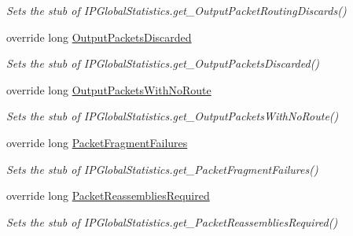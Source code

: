 \begin{DoxyCompactItemize}
\begin{DoxyCompactList}\small\item\em Sets the stub of I\-P\-Global\-Statistics.\-get\-\_\-\-Output\-Packet\-Routing\-Discards()\end{DoxyCompactList}\item 
override long \hyperlink{class_system_1_1_net_1_1_network_information_1_1_fakes_1_1_stub_i_p_global_statistics_a50c6c56c0427547ab7ed7b7be351ae3d}{Output\-Packets\-Discarded}
\begin{DoxyCompactList}\small\item\em Sets the stub of I\-P\-Global\-Statistics.\-get\-\_\-\-Output\-Packets\-Discarded()\end{DoxyCompactList}\item 
override long \hyperlink{class_system_1_1_net_1_1_network_information_1_1_fakes_1_1_stub_i_p_global_statistics_a4680f58580b8d9312ca791fab7e776b3}{Output\-Packets\-With\-No\-Route}
\begin{DoxyCompactList}\small\item\em Sets the stub of I\-P\-Global\-Statistics.\-get\-\_\-\-Output\-Packets\-With\-No\-Route()\end{DoxyCompactList}\item 
override long \hyperlink{class_system_1_1_net_1_1_network_information_1_1_fakes_1_1_stub_i_p_global_statistics_ada4c2682cae532de08e5c15489465c45}{Packet\-Fragment\-Failures}
\begin{DoxyCompactList}\small\item\em Sets the stub of I\-P\-Global\-Statistics.\-get\-\_\-\-Packet\-Fragment\-Failures()\end{DoxyCompactList}\item 
override long \hyperlink{class_system_1_1_net_1_1_network_information_1_1_fakes_1_1_stub_i_p_global_statistics_a4d86ca836bb4cb923ebfff0b8ffb8c13}{Packet\-Reassemblies\-Required}
\begin{DoxyCompactList}\small\item\em Sets the stub of I\-P\-Global\-Statistics.\-get\-\_\-\-Packet\-Reassemblies\-Required()\end{DoxyCompactList}\item 

\end{DoxyCompactItemize}
